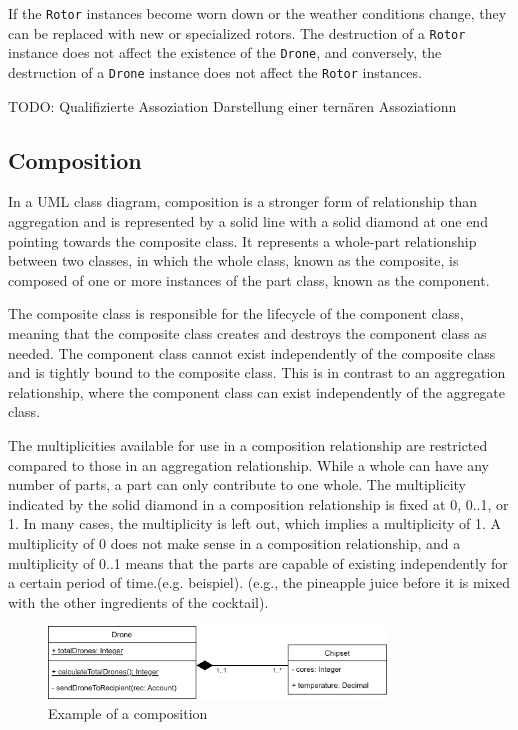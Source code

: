\documentclass[
	12pt,
    a4paper,
    egregdoesnotlikesansseriftitles, %
    toc=chapterentrywithdots,
    oneside, openany,
    titlepage,
    parskip=half,
    headings=normal,  %
    listof=totoc,
    bibliography=totoc,
    index=totoc,
    captions=tableheading,  %
    listof=flat,
    numbers=noenddot, %
    final]
    {scrbook}
\begin{document}
If the \texttt{Rotor} instances become worn down or the weather conditions change, they can be replaced with new or specialized rotors. 
The destruction of a \texttt{Rotor} instance does not affect the existence of the \texttt{Drone}, and conversely, the destruction of a \texttt{Drone} instance does not affect the \texttt{Rotor} instances.

TODO: Qualifizierte Assoziation
   Darstellung einer ternären Assoziationn


\subsection{Composition}

In a UML class diagram, composition is a stronger form of relationship than aggregation and is represented by a solid line with a solid diamond at one end pointing towards the composite class. It represents a whole-part relationship between two classes, in which the whole class, known as the composite, is composed of one or more instances of the part class, known as the component.

The composite class is responsible for the lifecycle of the component class, meaning that the composite class creates and destroys the component class as needed. The component class cannot exist independently of the composite class and is tightly bound to the composite class. This is in contrast to an aggregation relationship, where the component class can exist independently of the aggregate class.

The multiplicities available for use in a composition relationship are restricted compared to those in an aggregation relationship. While a whole can have any number of parts, a part can only contribute to one whole. The multiplicity indicated by the solid diamond in a composition relationship is fixed at 0, 0..1, or 1. In many cases, the multiplicity is left out, which implies a multiplicity of 1. A multiplicity of 0 does not make sense in a composition relationship, and a multiplicity of 0..1 means that the parts are capable of existing independently for a certain period of time.(e.g. beispiel).
(e.g., the pineapple juice before it is mixed with the other ingredients of the cocktail).
 \cite[p. 153-154]{uml}

\begin{figure}[h]
\centering
\includegraphics[width=0.8\textwidth]{figures/aggr_comp/comp.jpg}
\caption[Example composition]{Example of a composition}
\label{fig:composition_example}
\end{figure}
\end{document}
